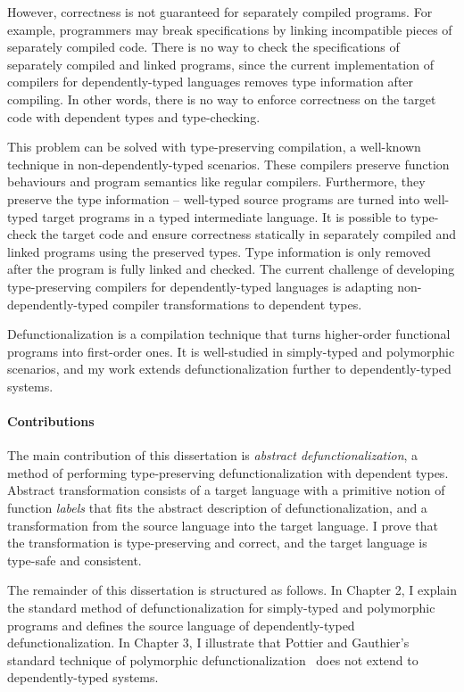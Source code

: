 However, correctness is not guaranteed for separately compiled programs. For example, programmers may break specifications by linking incompatible pieces of separately compiled code. There is no way to check the specifications of separately compiled and linked programs, since the current implementation of compilers for dependently-typed languages removes type information after compiling. In other words, there is no way to enforce correctness on the target code with dependent types and type-checking.

This problem can be solved with type-preserving compilation, a well-known technique in non-dependently-typed scenarios.
These compilers preserve function behaviours and program semantics like regular compilers. Furthermore, they preserve the type information – well-typed source programs are turned into well-typed target programs in a typed intermediate language. It is possible to type-check the target code and ensure correctness statically in separately compiled and linked programs using the preserved types. Type information is only removed after the program is fully linked and checked. The current challenge of developing type-preserving compilers for dependently-typed languages is adapting non-dependently-typed compiler transformations to dependent types. 

Defunctionalization is a compilation technique that turns higher-order functional programs into first-order ones. It is well-studied in simply-typed and polymorphic scenarios, and my work extends defunctionalization further to dependently-typed systems.

\paragraph{Contributions} 

The main contribution of this dissertation is \textit{abstract defunctionalization}, a method of performing type-preserving defunctionalization with dependent types.
Abstract transformation consists of a target language with a primitive notion of function \textit{labels} that fits the abstract description of defunctionalization, and a transformation from the source language into the target language. 
I prove that the transformation is type-preserving and correct, and the target language is type-safe and consistent.

The remainder of this dissertation is structured as follows. In Chapter 2, I explain the standard method of defunctionalization for simply-typed and polymorphic programs and defines the source language of dependently-typed defunctionalization. In Chapter 3, I illustrate that Pottier and Gauthier's standard technique of polymorphic defunctionalization~\cite{DBLP:conf/popl/PottierG04} does not extend to dependently-typed systems. 


